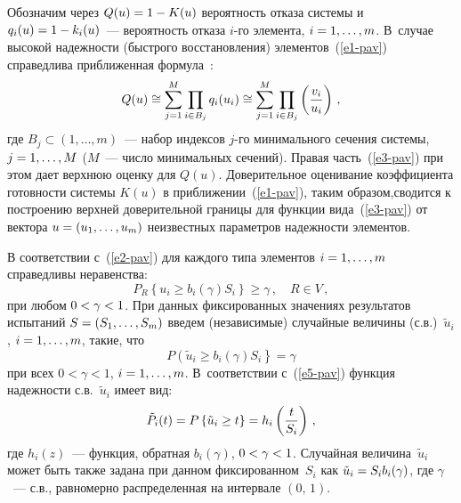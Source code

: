 \begin{multicols}{2}
     Обозначим через $Q(u)\hm=1-K(u)$ вероятность отказа системы и 
$q_i(u)\hm=1-k_i(u)$~--- вероятность отказа $i$-го элемента, $i\hm=1,\ldots 
,m$. В~случае высокой надежности (быстрого восстановления) 
элементов~(\ref{e1-pav}) справедлива приближенная 
     формула~\cite{1-pav, 2-pav}:
     \begin{equation}
     Q(u)\cong \sum\limits_{j=1}^M \prod_{i\in B_j} q_i(u_i) \cong 
\sum\limits_{j=1}^M \prod_{i\in B_j} \left( \displaystyle\frac{\displaystyle v_i\mathstrut}{\displaystyle u_i\mathstrut}\right)\,,
     \label{e3-pav}
     \end{equation}
где $B_j\subset (1,\ldots ,m)$~--- набор индексов $j$-го минимального сечения 
системы, $j\hm=1,\ldots ,M$ ($M$~--- чис\-ло минимальных сечений). 
Правая часть~(\ref{e3-pav}) при этом дает верхнюю оценку для $Q(u)$. 
Довери\-тельное оценивание коэффициента готовности сис\-те\-мы $K(u)$ в 
приближении~(\ref{e1-pav}), таким образом,\linebreak сводится к построению верхней 
доверительной границы для функции вида~(\ref{e3-pav}) от вектора 
$u\hm=(u_1,\ldots ,u_m)$ неизвестных параметров надежности элементов. 
     
     В соответствии с~(\ref{e2-pav}) для каждого типа элементов $i\hm= 
1,\ldots ,m$ справедливы неравенства:
     \begin{equation*}
     P_R\left\{ u_i\geq b_i(\gamma)S_i\right\} \geq \gamma\,,\quad R\in V\,,
     \end{equation*}
при любом $0\hm<\gamma\hm<1$. При данных фиксированных значениях 
результатов испытаний $S\hm= (S_1,\ldots , S_m)$ введем (независимые) 
случайные величины (с.в.)\ $\tilde{u}_i$, $i\hm=1,\ldots ,m$, такие, что 
\begin{equation}
P\left( \tilde{u}_i\geq b_i(\gamma) S_i\right\} =\gamma
\label{e5-pav}
\end{equation}
при всех $0<\gamma<1$, $i\hm=1,\ldots ,m$. В~соответствии с~(\ref{e5-pav}) 
функция надежности с.в.~$\tilde{u}_i$ имеет вид:
$$
\tilde{P}_i(t) = P\left\{ \tilde{u}_i\geq t\right\} = h_i\left( \displaystyle\frac{\displaystyle t\mathstrut}{\displaystyle S_i\mathstrut}\right)\,,
$$
где $h_i(z)$~--- функция, обратная $b_i(\gamma)$, $0\hm< \gamma\hm <1$. 
Случайная величина~$\tilde{u}_i$ может быть также задана при данном 
фиксированном~$S_i$ как $\tilde{u}_i\hm= S_i b_i(\gamma)$, где 
$\gamma$~--- с.в., равномерно распределенная на интервале $(0,\,1)$. 
     

\end{multicols}
